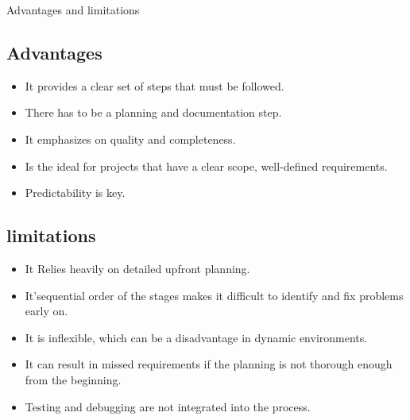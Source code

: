 \begin{section}{Advantages and limitations}
    \subsection{Advantages}
    
    \begin{itemize}
        \item It provides a clear set of steps that must be followed.
        
        \item There has to be a planning and documentation step.
        
        \item It emphasizes on quality and completeness.
        
        \item Is the ideal for projects that have a clear scope, well-defined requirements.
        
        \item Predictability is key.
    
    \end{itemize}
    \subsection{limitations}
    
    \begin{itemize}
        \item It Relies heavily on detailed upfront planning.
               
        \item It'sequential order of the stages makes it difficult to identify and fix problems early on.
        
        \item It is inflexible, which can be a disadvantage in dynamic environments.
        \
        \item It can result in missed requirements if the planning is not thorough enough from the beginning.
        
        \item Testing and debugging are not integrated into the process.
   
    \end{itemize}
    
    
    \end{section}
